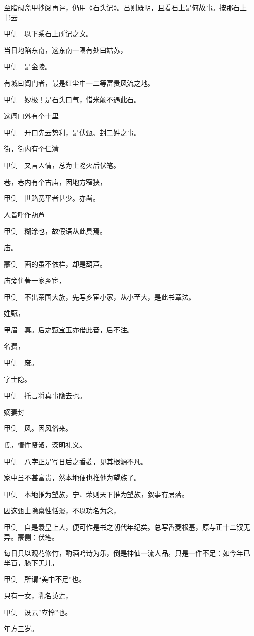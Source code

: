 \begin{parag}
    至脂砚斋甲抄阅再评，仍用《石头记》。出则既明，且看石上是何故事。按那石上书云：\begin{note}甲侧：以下系石上所记之文。\end{note}
\end{parag}


\begin{parag}
    当日地陷东南，这东南一隅有处曰姑苏，\begin{note}甲侧：是金陵。\end{note}有城曰阊门者，最是红尘中一二等富贵风流之地。\begin{note}甲侧：妙极！是石头口气，惜米颠不遇此石。\end{note}这阊门外有个十里\begin{note}甲侧：开口先云势利，是伏甄、封二姓之事。\end{note}街，街内有个仁清\begin{note}甲侧：又言人情，总为士隐火后伏笔。\end{note}巷，巷内有个古庙，因地方窄狭，\begin{note}甲侧：世路宽平者甚少。亦凿。\end{note}人皆呼作葫芦\begin{note}甲侧：糊涂也，故假语从此具焉。\end{note}庙。\begin{note}蒙侧：画的虽不依样，却是葫芦。\end{note}庙旁住著一家乡宦，\begin{note}甲侧：不出荣国大族，先写乡宦小家，从小至大，是此书章法。\end{note}姓甄，\begin{note}甲眉：真。后之甄宝玉亦借此音，后不注。\end{note}名费，\begin{note}甲侧：废。\end{note}字士隐。\begin{note}甲侧：托言将真事隐去也。\end{note}嫡妻封\begin{note}甲侧：风。因风俗来。\end{note}氏，情性贤淑，深明礼义。\begin{note}甲侧：八字正是写日后之香菱，见其根源不凡。\end{note}家中虽不甚富贵，然本地便也推他为望族了。\begin{note}甲侧：本地推为望族，宁、荣则天下推为望族，叙事有层落。\end{note}因这甄士隐禀性恬淡，不以功名为念，\begin{note}甲侧：自是羲皇上人，便可作是书之朝代年纪矣。总写香菱根基，原与正十二钗无异。蒙侧：伏笔。\end{note}每日只以观花修竹，酌酒吟诗为乐，倒是神仙一流人品。只是一件不足：如今年已半百，膝下无儿，\begin{note}甲侧：所谓“美中不足”也。\end{note}只有一女，乳名英莲，\begin{note}甲侧：设云“应怜”也。\end{note}年方三岁。
\end{parag}


